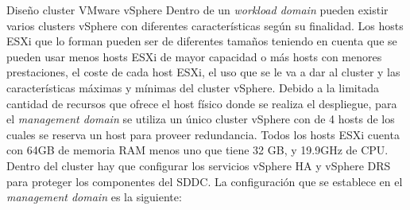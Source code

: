 \begin{subsubsection}{Diseño cluster VMware vSphere}
Dentro de un \textit{workload domain} pueden existir varios clusters vSphere con diferentes características según su finalidad. Los hosts ESXi que lo forman pueden ser de diferentes tamaños teniendo en cuenta que se pueden usar menos hosts ESXi de mayor capacidad o más hosts con menores prestaciones, el coste de cada host ESXi, el uso que se le va a dar al cluster y las características máximas y mínimas del cluster vSphere. Debido a la limitada cantidad de recursos que ofrece el host físico donde se realiza el despliegue, para el \textit{management domain} se utiliza un único cluster vSphere con de 4 hosts de los cuales se reserva un host para proveer redundancia. Todos los hosts ESXi cuenta con 64GB de memoria RAM menos uno que tiene 32 GB, y 19.9GHz de CPU. Dentro del cluster hay que configurar los servicios vSphere HA y vSphere DRS para proteger los componentes del SDDC. La configuración que se establece en el \textit{management domain} es la siguiente:


\end{subsubsection}
